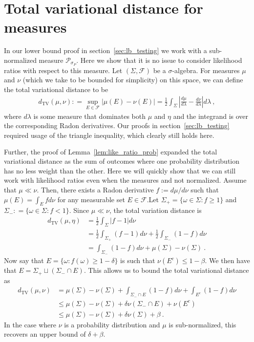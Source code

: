 \documentclass[11pt]{article}
\newcommand{\TV}{d_{\text{TV}}}
\begin{document}
\section{Total variational distance for measures}\label{app:tvd}
In our lower bound proof in section~\ref{sec:lb_testing} we work with a sub-normalized measure $\mathcal{P}_{\sigma_P}$. Here we show that it is no issue to consider likelihood ratios with respect to this measure. Let $(\Sigma, \mathcal{F})$ be a $\sigma$-algebra. For measures $\mu$ and $\nu$ (which we take to be bounded for simplicity) on this space, we can define the total variational distance to be
\begin{align}
    \TV(\mu,\nu) : = \sup_{E \in \mathcal{F}}\left\vert \mu(E) - \nu(E)\right\vert = \frac{1}{2}\int_\Sigma \left\vert \frac{d\mu}{d\lambda} - \frac{d\nu}{d\lambda}\right\vert d\lambda\ ,
\end{align}
where $d\lambda$ is some measure that dominates both $\mu$ and $\eta$ and the integrand is over the corresponding Radon derivatives. Our proofs in section~\ref{sec:lb_testing} required usage of the triangle inequality, which clearly still holds here.

Further, the proof of Lemma~\ref{lem:like_ratio_prob} expanded the total variational distance as the sum of outcomes where one probability distribution has no less weight than the other. Here we will quickly show that we can still work with likelihood ratios even when the measures and not normalized. Assume that $\mu \ll \nu$. Then, there exists a Radon derivative $f:=d\mu/d\nu$ such that $\mu(E) = \int_E fd\nu$ for any measurable set $E \in \mathcal{F}$.Let $\Sigma_+ = \{\omega \in \Sigma: f \geq 1\}$ and $\Sigma_- : =\{\omega \in \Sigma: f < 1\}$. Since $\mu \ll \nu$, the total variation distance is
\begin{align}
    \TV(\mu,\eta) & = \frac{1}{2}\int_\Sigma \vert f-1\vert d\nu\\
    & = \frac{1}{2}\int_{\Sigma_+} (f-1) d\nu + \frac{1}{2}\int_{\Sigma_-}(1-f) d\nu\\
    & = \int_{\Sigma_-}(1-f)d\nu + \mu(\Sigma) - \nu(\Sigma)\ .
\end{align}
Now say that $E=\{\omega: f(\omega) \geq 1-\delta\}$ is such that $\nu(E^c) \leq 1-\beta$. We then have that $E = \Sigma_+ \sqcup (\Sigma_-\cap E)$. This allows us to bound the total variational distance as
\begin{align}
    \TV(\mu,\nu) & = \mu(\Sigma)-\nu(\Sigma) + \int_{\Sigma_-\cap E}(1-f)d\nu + \int_{E^c} (1-f)d\nu\\
    & \leq \mu(\Sigma)-\nu(\Sigma) + \delta \nu(\Sigma_- \cap E) + \nu(E^c)\\
    & \leq \mu(\Sigma) - \nu(\Sigma) + \delta \nu(\Sigma) + \beta\ .
\end{align}
In the case where $\nu$ is a probability distribution and $\mu$ is sub-normalized, this recovers an upper bound of $\delta + \beta$.
\end{document}
